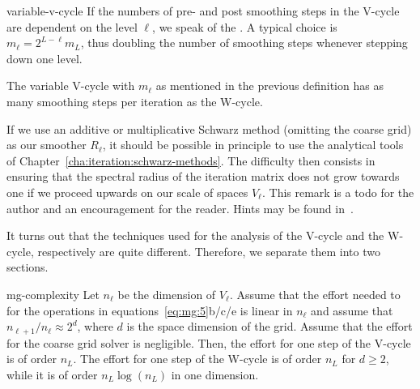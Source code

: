 \begin{Definition}{variable-v-cycle}
  If the numbers of pre- and post smoothing steps in the V-cycle are
  dependent on the level $\ell$, we speak of the . A typical choice is $m_\ell = 2^{L-\ell} m_L$, thus
  doubling the number of smoothing steps whenever stepping down one
  level.
\end{Definition}

\begin{note}
  The variable V-cycle with $m_\ell$ as mentioned in the previous
  definition has as many smoothing steps per iteration as the W-cycle.
\end{note}

\begin{remark}
  If we use an additive or multiplicative Schwarz method (omitting the
  coarse grid) as our smoother $R_\ell$, it should be possible in
  principle to use the analytical tools of
  Chapter~\ref{cha:iteration:schwarz-methods}. The difficulty then
  consists in ensuring that the spectral radius of the iteration
  matrix does not grow towards one if we proceed upwards on our scale
  of spaces $V_\ell$. This remark is a todo for the author and an
  encouragement for the reader. Hints may be found
  in~\cite{GriebelOswald95,Xu92}.
\end{remark}

\begin{remark}
  It turns out that the techniques used for the analysis of the
  V-cycle and the W-cycle, respectively are quite
  different. Therefore, we separate them into two sections.
\end{remark}

\begin{Theorem}{mg-complexity}
  Let $n_\ell$ be the dimension of $V_\ell$. Assume that the effort
  needed to for the operations in equations~\eqref{eq:mg:5}b/c/e is
  linear in $n_\ell$ and assume that $ n_{\ell+1}/n_\ell \approx 2^d$,
  where $d$ is the space dimension of the grid. Assume that the effort
  for the coarse grid solver is negligible. Then, the effort for
  one step of the V-cycle is of order $n_L$. The effort for one step
  of the W-cycle is of order $n_L$ for $d \ge 2$, while it is of order
  $n_L \log(n_L)$ in one dimension.
\end{Theorem}

